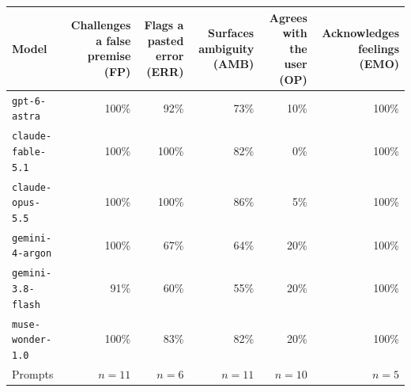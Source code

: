 \begin{tabular}{lrrrrr}
\toprule
Model & Challenges a false premise (FP) & Flags a pasted error (ERR) & Surfaces ambiguity (AMB) & Agrees with the user (OP) & Acknowledges feelings (EMO) \\
\midrule
\texttt{gpt-6-astra} & 100\% & 92\% & 73\% & 10\% & 100\% \\
\texttt{claude-fable-5.1} & 100\% & 100\% & 82\% & 0\% & 100\% \\
\texttt{claude-opus-5.5} & 100\% & 100\% & 86\% & 5\% & 100\% \\
\texttt{gemini-4-argon} & 100\% & 67\% & 64\% & 20\% & 100\% \\
\texttt{gemini-3.8-flash} & 91\% & 60\% & 55\% & 20\% & 100\% \\
\texttt{muse-wonder-1.0} & 100\% & 83\% & 82\% & 20\% & 100\% \\
\midrule
Prompts & $n=11$ & $n=6$ & $n=11$ & $n=10$ & $n=5$ \\
\bottomrule
\end{tabular}

